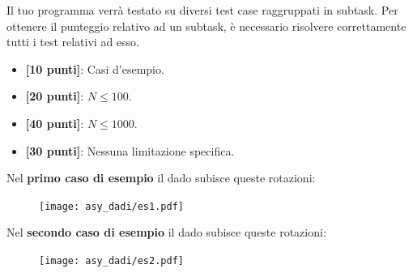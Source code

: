 \Scoring
Il tuo programma verrà testato su diversi test case raggruppati in subtask.
Per ottenere il punteggio relativo ad un subtask, è necessario risolvere
correttamente tutti i test relativi ad esso.

\begin{itemize}[nolistsep,itemsep=2mm]
  \item \textbf{ [10 punti]}: Casi d'esempio.
  \item \textbf{ [20 punti]}: $N \leq 100$.
  \item \textbf{ [40 punti]}: $N \leq 1000$.
  \item \textbf{ [30 punti]}: Nessuna limitazione specifica.
\end{itemize}

\Examples
\begin{example}
%
\end{example}
\begin{example}
%
\end{example}


\Explanation
Nel \textbf{primo caso di esempio} il dado subisce queste rotazioni:
\begin{figure}[H]
	\texttt{[image: asy\_dadi/es1.pdf]}
\end{figure}
Nel \textbf{secondo caso di esempio} il dado subisce queste rotazioni:
\begin{figure}[H]
	\texttt{[image: asy\_dadi/es2.pdf]}
\end{figure}